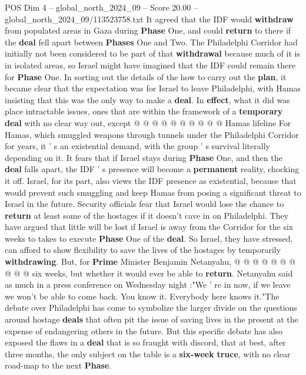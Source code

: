 \begin{textsample}{POS Dim 4 – global\_north\_2024\_09 – Score 20.00 – global\_north\_2024\_09/113523758.txt}
It agreed that the IDF would \textbf{withdraw} from populated areas in Gaza during \textbf{Phase} One, and could \textbf{return} to there if the \textbf{deal} fell apart between \textbf{Phases} One and Two.
The Philadelphi Corridor had initially not been considered to be part of that \textbf{withdrawal} because much of it is in isolated areas, so Israel might have imagined that the IDF could remain there for \textbf{Phase} One.
In sorting out the details of the how to carry out the \textbf{plan}, it became clear that the expectation was for Israel to leave Philadelphi, with Hamas insisting that this was the only way to make a \textbf{deal}.
In \textbf{effect}, what it did was place intractable issues, ones that are within the framework of a \textbf{temporary} \textbf{deal} with no clear way out, except @ @ @ @ @ @ @ @ @ @ Hamas lifeline For Hamas, which smuggled weapons through tunnels under the Philadelphi Corridor for years, it ' s an existential demand, with the group ' s survival literally depending on it.
It fears that if Israel stays during \textbf{Phase} One, and then the \textbf{deal} falls apart, the IDF ' s presence will become a \textbf{permanent} reality, chocking it off.
Israel, for its part, also views the IDF presence as existential, because that would prevent such smuggling and keep Hamas from posing a significant threat to Israel in the future.
Security officials fear that Israel would lose the chance to \textbf{return} at least some of the hostages if it doesn't cave in on Philadelphi.
They have argued that little will be lost if Israel is away from the Corridor for the six weeks to takes to execute \textbf{Phase} One of the \textbf{deal}.
So Israel, they have stressed, can afford to show flexibility to save the lives of the hostages by temporarily \textbf{withdrawing}.
But, for \textbf{Prime} Minister Benjamin Netanyahu, @ @ @ @ @ @ @ @ @ @ six weeks, but whether it would ever be able to \textbf{return}.
Netanyahu said as much in a press conference on Wednesday night :"We ' re in now, if we leave we won't be able to come back.
You know it.
Everybody here knows it."The debate over Philadelphi has come to symbolize the larger divide on the questions around hostage \textbf{deals} that often pit the issue of saving lives in the present at the expense of endangering others in the future.
But this specific debate has also exposed the flaws in a \textbf{deal} that is so fraught with discord, that at best, after three months, the only subject on the table is a \textbf{six-week} \textbf{truce}, with no clear road-map to the next \textbf{Phase}.

\end{textsample}
